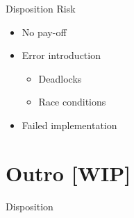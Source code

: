 \begin{frame}{\secname}{Disposition}
	Risk
	\begin{itemize}
		\item No pay-off
		\item Error introduction
		\begin{itemize}
			\item Deadlocks
			\item Race conditions
		\end{itemize}
		\item Failed implementation
	\end{itemize}
\end{frame}

\section{Outro [WIP]}
\begin{frame}{\secname}{Disposition}

\end{frame}
